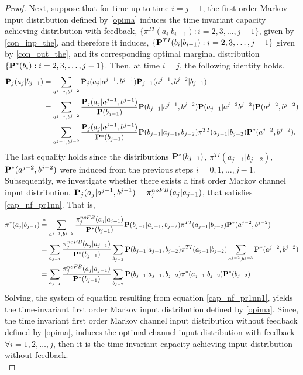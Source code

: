 \documentclass[11pt, a4paper, journal,onecolumn]{IEEEtran}
\newcommand{\sr}{\stackrel}
\begin{document}
\begin{proof}
Next, suppose that for time up to time  $i=j-1$, the first order Markov input distribution defined by  \eqref{opima} induces the time invariant capacity achieving distribution with feedback, $\{{\pi}^{TI}(a_{i}|b_{i-1}):i=2,3,\ldots,j-1\}$, given by \eqref{con_inp_the}, and therefore it induces, $\{{\bf P}^{TI}(b_i|b_{i-1}):i=2,3,\ldots,j-1\}$ given by \eqref{con_out_the}, and its corresponding optimal marginal distribution $\{{\bf P}^*(b_i):i=2,3,\ldots,j-1\}$. Then, at time $i=j$, the following identity holds.
\begin{align}
{\bf P}_j(a_j|b_{j-1})
&=\sum_{ a^{j-1},b^{j-2}}{\bf P}_j(a_j|a^{j-1}, b^{j-1}){\bf P}_{j-1}(a^{j-1},b^{j-2}|b_{j-1})\nonumber\\
&=\sum_{ a^{j-1},b^{j-2}}\frac{{\bf P}_j(a_j|a^{j-1}, b^{j-1})}{{\bf P}(b_{j-1})}{\bf P}(b_{j-1}|a^{j-1},b^{j-2}){\bf P}(a_{j-1}|a^{j-2}b^{j-2}){\bf P}(a^{j-2},b^{j-2})\nonumber\\
&=\sum_{ a^{j-1},b^{j-2}}\frac{{\bf P}_j(a_j|a^{j-1}, b^{j-1})}{{\bf P}^*(b_{j-1})}{\bf P}(b_{j-1}|a_{j-1},b_{j-2}){\pi}^{TI}(a_{j-1}|b_{j-2}){\bf P}^*(a^{j-2},b^{j-2}). \label{cap_nf_pr1nn}
\end{align}
The last equality holds since the distributions ${\bf P}^*(b_{j-1})$, ${\pi}^{TI}(a_{j-1}|b_{j-2})$, ${\bf P}^*(a^{j-2},b^{j-2})$ were induced from the previous steps $i=0,1,\ldots,j-1$. Subsequently, we investigate whether there exists a first order Markov channel input distribution, ${\bf P}_j(a_j|a^{j-1}, b^{j-1})={\pi}^{noFB}_j(a_j|a_{j-1})$, that satisfies \eqref{cap_nf_pr1nn}. That is, 
\begin{align}
{\pi}^*(a_{j}|b_{j-1})&\sr{?}{=}\sum_{ a^{j-1},b^{j-2}}\frac{{\pi}^{noFB}_j(a_j|a_{j-1})}{{\bf P}^*(b_{j-1})}{\bf P}(b_{j-1}|a_{j-1},b_{j-2}){\pi}^{TI}(a_{j-1}|b_{j-2}){\bf P}^*(a^{j-2},b^{j-2})\nonumber\\
&=\sum_{ a_{j-1}}\frac{{\pi}^{noFB}_j(a_j|a_{j-1})}{{\bf P}^*(b_{j-1})}\sum_{b_{j-2}}{\bf P}(b_{j-1}|a_{j-1},b_{j-2}){\pi}^{TI}(a_{j-1}|b_{j-2})\sum_{ a^{j-2},b^{j-3}}{\bf P}^*(a^{j-2},b^{j-2})\nonumber\\
&=\sum_{ a_{j-1}}\frac{{\pi}^{noFB}_j(a_j|a_{j-1})}{{\bf P}^*(b_{j-1})}\sum_{b_{j-2}}{\bf P}(b_{j-1}|a_{j-1},b_{j-2}){\pi}^*(a_{j-1}|b_{j-2}){\bf P}^*(b_{j-2})\label{cap_nf_pr1nn1}
\end{align}
Solving, the system of equation resulting from equation \eqref{cap_nf_pr1nn1}, yields the time-invariant first order Markov input distribution defined by \eqref{opima}. Since, the time invariant first order Markov channel input distribution without feedback defined by \eqref{opima}, induces the optimal channel input distribution with feedback $\forall i=1,2,\ldots,j$, then it is the time invariant capacity achieving input distribution without feedback. \\

\end{proof}
\end{document}
